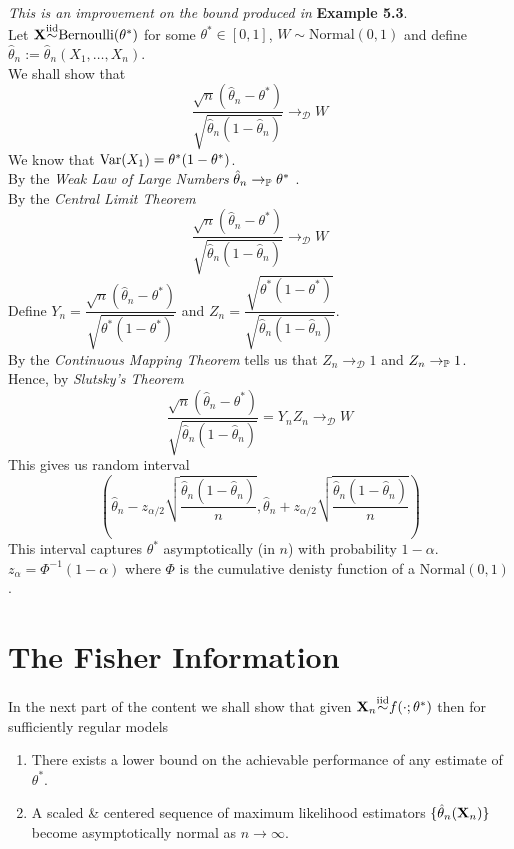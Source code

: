 \documentclass[11pt,a4paper]{article}
\begin{document}
\textit{This is an improvement on the bound produced in }\textbf{Example 5.3}.\\
Let $\textbf{X}{\overset{\text{iid}}{\sim}}\text{Bernoulli}(\theta^*)$ for some $\theta^*\in[0,1]$, $W\sim\text{Normal}(0,1)$ and define $\hat{\theta}_n:=\hat{\theta}_n(X_1,\dots,X_n)$.\\
We shall show that
$$\frac{\sqrt{n}(\hat{\theta}_n-\theta^*)}{\sqrt{\hat{\theta}_n(1-\hat{\theta}_n)}}\to_\mathcal{D}W$$
We know that $\mathrm{Var}(X_1)=\theta^*(1-\theta^*)$.\\
By the \textit{Weak Law of Large Numbers} $\hat{\theta}_n\to_{\mathbb{P}}\theta^*$ .\\
By the \textit{Central Limit Theorem}
$$\frac{\sqrt{n}(\hat{\theta}_n-\theta^*)}{\sqrt{\hat{\theta}_n(1-\hat{\theta}_n)}}\to_\mathcal{D}W$$
Define $Y_n=\dfrac{\sqrt{n}(\hat{\theta}_n-\theta^*)}{\sqrt{\theta^*(1-\theta^*)}}$ and $Z_n=\dfrac{\sqrt{\theta^*(1-\theta^*)}}{\sqrt{\hat{\theta}_n(1-\hat{\theta}_n)}}$.\\
By the \textit{Continuous Mapping Theorem} tells us that $Z_n\to_\mathcal{D}1$ and $Z_n\to_{\mathbb{P}}1$.\\
Hence, by \textit{Slutsky's Theorem}
$$\frac{\sqrt{n}(\hat{\theta}_n-\theta^*)}{\sqrt{\hat{\theta}_n(1-\hat{\theta}_n)}}=Y_nZ_n\to_\mathcal{D}W$$
This gives us random interval
$$\left(\hat{\theta}_n-z_{\alpha/2}\sqrt{\frac{\hat{\theta}_n(1-\hat{\theta}_n)}{n}},\hat{\theta}_n+z_{\alpha/2}\sqrt{\frac{\hat{\theta}_n(1-\hat{\theta}_n)}{n}}\right)$$
This interval captures $\theta^*$ asymptotically (in $n$) with probability $1-\alpha$.\\
\nb $z_\alpha=\Phi^{-1}(1-\alpha)$ where $\Phi$ is the cumulative denisty function of a $\text{Normal}(0,1)$.

\section{The Fisher Information}

In the next part of the content we shall show that given $\textbf{X}_n{\overset{\text{iid}}{\sim}}f(\cdot;\theta^*)$ then for sufficiently regular models
\begin{enumerate}[label=\roman*)]
	\item There exists a lower bound on the achievable performance of any estimate of $\theta^*$.
	\item A scaled \& centered sequence of maximum likelihood estimators $\{\hat{\theta}_n(\textbf{X}_n)\}$ become asymptotically normal as $n\to\infty$.
\end{enumerate}
\end{document}
